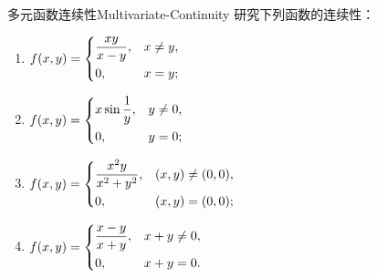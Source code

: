 \begin{problem}{多元函数连续性}{Multivariate-Continuity}
    研究下列函数的连续性：
    \begin{enumerate}
        \item $f(x, y) = \begin{dcases} \dfrac{xy}{x-y}, & x \neq y, \\ 0, & x = y; \end{dcases}$
        \item $f(x, y) = \begin{dcases} x \sin \dfrac{1}{y}, & y \neq 0, \\ 0, & y = 0; \end{dcases}$
        \item $f(x, y) = \begin{dcases} \dfrac{x^2y}{x^2+y^2}, & (x, y) \neq (0, 0), \\ 0, & (x, y) = (0, 0); \end{dcases}$
        \item $f(x, y) = \begin{dcases} \dfrac{x-y}{x+y}, & x + y \neq 0, \\ 0, & x + y = 0. \end{dcases}$
    \end{enumerate}
\end{problem}

